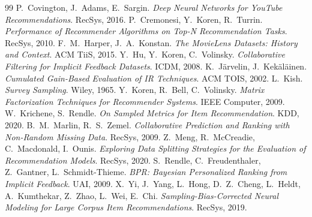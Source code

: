 \documentclass[a4paper,11pt]{article}
\begin{document}
\begin{thebibliography}{99}
 P.~Covington, J.~Adams, E.~Sargin. \emph{Deep Neural Networks for YouTube Recommendations}. RecSys, 2016.
 P.~Cremonesi, Y.~Koren, R.~Turrin. \emph{Performance of Recommender Algorithms on Top-N Recommendation Tasks}. RecSys, 2010.
 F.~M.~Harper, J.~A.~Konstan. \emph{The MovieLens Datasets: History and Context}. ACM TiiS, 2015.
 Y.~Hu, Y.~Koren, C.~Volinsky. \emph{Collaborative Filtering for Implicit Feedback Datasets}. ICDM, 2008.
 K.~Järvelin, J.~Kekäläinen. \emph{Cumulated Gain-Based Evaluation of IR Techniques}. ACM TOIS, 2002.
 L.~Kish. \emph{Survey Sampling}. Wiley, 1965.
 Y.~Koren, R.~Bell, C.~Volinsky. \emph{Matrix Factorization Techniques for Recommender Systems}. IEEE Computer, 2009.
 W.~Krichene, S.~Rendle. \emph{On Sampled Metrics for Item Recommendation}. KDD, 2020.
 B.~M.~Marlin, R.~S.~Zemel. \emph{Collaborative Prediction and Ranking with Non-Random Missing Data}. RecSys, 2009.
 Z.~Meng, R.~McCreadie, C.~Macdonald, I.~Ounis. \emph{Exploring Data Splitting Strategies for the Evaluation of Recommendation Models}. RecSys, 2020.
 S.~Rendle, C.~Freudenthaler, Z.~Gantner, L.~Schmidt-Thieme. \emph{BPR: Bayesian Personalized Ranking from Implicit Feedback}. UAI, 2009.
 X.~Yi, J.~Yang, L.~Hong, D.~Z.~Cheng, L.~Heldt, A.~Kumthekar, Z.~Zhao, L.~Wei, E.~Chi. \emph{Sampling-Bias-Corrected Neural Modeling for Large Corpus Item Recommendations}. RecSys, 2019.
\end{thebibliography}
\end{document}
